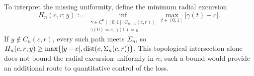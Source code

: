 To interpret the missing uniformity, define the minimum radial
excursion
\[
 H_n(c,r;y):=\inf_{\substack{\gamma\in C^0([0,1],C_{n-1}(c,r))\\
                   \gamma(0)=c,\ \gamma(1)=y}}
                   \max_{t\in[0,1]}|\gamma(t)-c|.
\]
If \(y\notin C_n(c,r)\), every such path meets \(\Sigma_n\), so
\(H_n(c,r;y)\ge\max\{|y-c|,\operatorname{dist}(c,\Sigma_n(c,r))\}\). This topological
intersection alone does not bound the radial excursion uniformly in
\(n\); such a bound would provide an additional route to quantitative
control of the loss.
